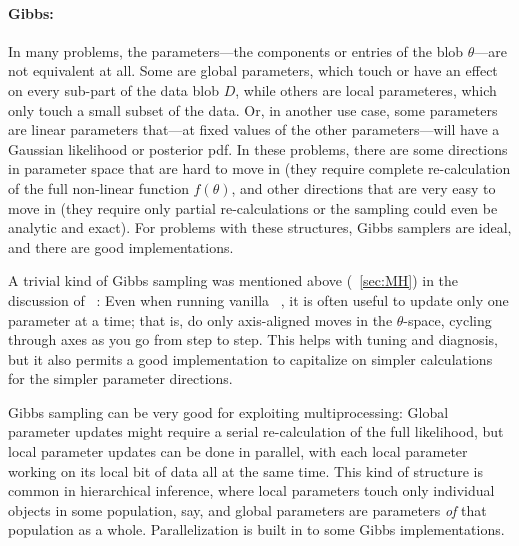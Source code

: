 \documentclass[modern]{aastex61}
\newcommand{\MCMC}{\acronym{MCMC}}
\newcommand{\MH}{\acronym{M--H}}
\newcommand{\data}{D}
\newcommand{\pars}{\theta}
\begin{document}
\paragraph{Gibbs:}
In many problems, the parameters---the components or entries of the
blob $\pars$---are not equivalent at all.
Some are global parameters, which touch or have an effect on every
sub-part of the data blob $\data$, while others are local parameteres,
which only touch a small subset of the data.
Or, in another use case, some parameters are linear parameters
that---at fixed values of the other parameters---will have a Gaussian
likelihood or posterior pdf.
In these problems, there are some directions in parameter space that
are hard to move in (they require complete re-calculation of the full
non-linear function $f(\pars)$, and other directions that are very
easy to move in (they require only partial re-calculations or the
sampling could even be analytic and exact).
For problems with these structures, Gibbs samplers are ideal, and
there are good implementations.

A trivial kind of Gibbs sampling was mentioned above (\sectionname~\ref{sec:MH}) in the
discussion of \MH\ \MCMC:
Even when running vanilla \MH\ \MCMC, it is often useful to update only
one parameter at a time; that is, do only axis-aligned moves in the
$\pars$-space, cycling through axes as you go from step to step.
This helps with tuning and diagnosis, but it also permits a good
implementation to capitalize on simpler calculations for the simpler
parameter directions.

Gibbs sampling can be very good for exploiting multiprocessing:
Global parameter updates might require a serial re-calculation of the
full likelihood, but local parameter updates can be done in parallel,
with each local parameter working on its local bit of data all at the
same time.
This kind of structure is common in hierarchical inference, where
local parameters touch only individual objects in some population,
say, and global parameters are parameters \emph{of} that population as
a whole.
Parallelization is built in to some Gibbs implementations.
\end{document}
